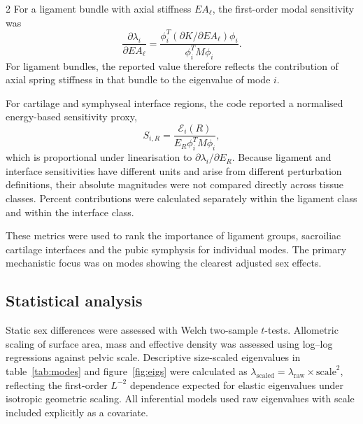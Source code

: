 \documentclass[openacc]{rsproca_new}
\begin{document}
\begin{multicols}{2}
For a ligament bundle with axial stiffness $EA_{\ell}$, the first-order modal sensitivity was
\[
\frac{\partial \lambda_i}{\partial EA_{\ell}} =
\frac{\phi_i^{T}(\partial K/\partial EA_{\ell})\phi_i}
{\phi_i^{T}M\phi_i}.
\]
For ligament bundles, the reported value therefore reflects the contribution of axial spring stiffness in that bundle to the eigenvalue of mode $i$.

For cartilage and symphyseal interface regions, the code reported a normalised energy-based sensitivity proxy,
\[
S_{i,R} =
\frac{\mathcal{E}_{i}(R)}
{E_R \phi_i^{T}M\phi_i},
\]
which is proportional under linearisation to $\partial \lambda_i/\partial E_R$. Because ligament and interface sensitivities have different units and arise from different perturbation definitions, their absolute magnitudes were not compared directly across tissue classes. Percent contributions were calculated separately within the ligament class and within the interface class.

These metrics were used to rank the importance of ligament groups, sacroiliac cartilage interfaces and the pubic symphysis for individual modes. The primary mechanistic focus was on modes showing the clearest adjusted sex effects.

\subsection{Statistical analysis}

Static sex differences were assessed with Welch two-sample $t$-tests. Allometric scaling of surface area, mass and effective density was assessed using log--log regressions against pelvic scale. Descriptive size-scaled eigenvalues in table~\ref{tab:modes} and figure~\ref{fig:eigs} were calculated as $\lambda_{\mathrm{scaled}}=\lambda_{\mathrm{raw}}\times \mathrm{scale}^{2}$, reflecting the first-order $L^{-2}$ dependence expected for elastic eigenvalues under isotropic geometric scaling. All inferential models used raw eigenvalues with scale included explicitly as a covariate.


\end{multicols}
\end{document}

